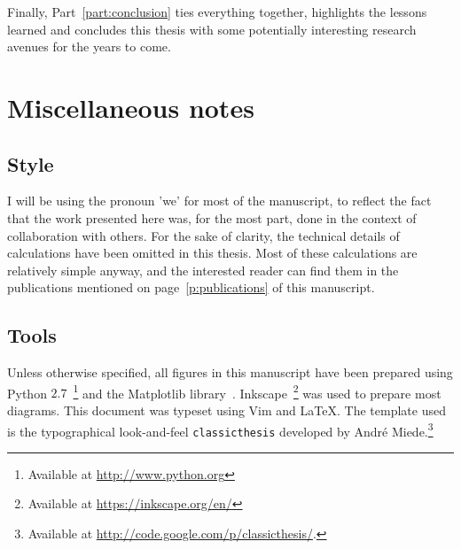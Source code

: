 Finally, Part~\ref{part:conclusion} ties everything together, highlights the lessons
learned and concludes this thesis with some potentially interesting research avenues for the
years to come.



\section{Miscellaneous notes}

\subsection{Style}
\label{sub:style}

I will be using the pronoun 'we' for most of the manuscript, to reflect the fact
that the work presented here was, for the most part, done in the context of
collaboration with others. For the sake of clarity, the technical details of
calculations have been omitted in this thesis. Most of these calculations are
relatively simple anyway, and the interested reader can find them in the
publications mentioned on page~\ref{p:publications} of this manuscript.

\subsection{Tools}
\label{sub:tools}

Unless otherwise specified, all figures in this manuscript have been prepared
using Python $2.7$~\footnote{Available at \url{http://www.python.org}} and the
Matplotlib library~\cite{Hunter:2007}. Inkscape~\footnote{Available at
\url{https://inkscape.org/en/}} was used to prepare most diagrams. This document
was typeset using Vim and \LaTeX. The template used is the typographical look-and-feel
\texttt{classicthesis} developed by Andr\'e
Miede.\footnote{Available at 
\url{http://code.google.com/p/classicthesis/}.}

\begin{center}
\end{center}
